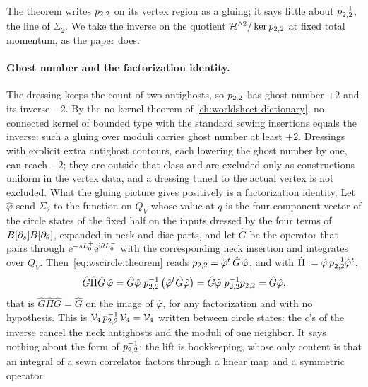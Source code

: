 
The theorem writes $p_{2,2}$ on its vertex region as a gluing; it says little about $p_{2,2}^{-1}$, the line of $\Sigma_2$.
We take the inverse on the quotient $\mathcal{H}^{\wedge 2} / \ker p_{2,2}$ at fixed total momentum, as the paper does.

\paragraph{Ghost number and the factorization identity.}
The dressing keeps the count of two antighosts, so $p_{2,2}$ has ghost number $+ 2$ and its inverse $- 2$.
By the no-kernel theorem of \cref{ch:worldsheet-dictionary}, no connected kernel of bounded type with the standard sewing insertions equals the inverse: such a gluing over moduli carries ghost number at least $+ 2$.
Dressings with explicit extra antighost contours, each lowering the ghost number by one, can reach $- 2$; they are outside that class and are excluded only as constructions uniform in the vertex data, and a dressing tuned to the actual vertex is not excluded.
What the gluing picture gives positively is a factorization identity.
Let $\hat\varphi$ send $\Sigma_2$ to the function on $Q_V$ whose value at $q$ is the four-component vector of the circle states of the fixed half on the inputs dressed by the four terms of $B[\partial_s] B[\partial_\theta]$, expanded in neck and disc parts, and let $\hat G$ be the operator that pairs through $\mathrm{e}^{- s L_0^+} \mathrm{e}^{\mathrm{i} \theta L_0^-}$ with the corresponding neck insertion and integrates over $Q_V$.
Then~\eqref{eq:wscircle:theorem} reads $p_{2,2} = {\hat\varphi^t} \, \hat G \, \hat\varphi$, and with $\hat\Pi := \hat\varphi \, p_{2,2}^{-1} {\hat\varphi^t}$,
\begin{equation}
  \label{eq:wscircle:GPiG}
  \hat G \hat\Pi \hat G \, \hat\varphi
    = \hat G \hat\varphi \; p_{2,2}^{-1} \, \big( {\hat\varphi^t} \hat G \hat\varphi \big)
    = \hat G \hat\varphi \; p_{2,2}^{-1} p_{2,2}
    = \hat G \hat\varphi,
\end{equation}
that is $\hat G \hat\Pi \hat G = \hat G$ on the image of $\hat\varphi$, for any factorization and with no hypothesis.
This is $\mathcal{V}_{4} \, p_{2,2}^{-1} \, \mathcal{V}_{4} = \mathcal{V}_{4}$ written between circle states: the $c$'s of the inverse cancel the neck antighosts and the moduli of one neighbor.
It says nothing about the form of $p_{2,2}^{-1}$; the lift is bookkeeping, whose only content is that an integral of a sewn correlator factors through a linear map and a symmetric operator.


